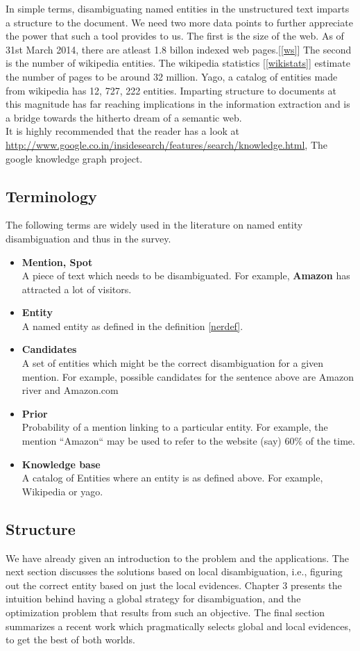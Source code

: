 In simple terms, disambiguating named entities in the unstructured text imparts a structure to the document. 
We need two more data points to further appreciate the power that such a tool provides to us.
The first is the size of the web. As of 31st March 2014, there are atleast 1.8 billon indexed web pages.[\ref{ws}]
The second is the number of wikipedia entities. The wikipedia statistics [\ref{wikistats}] estimate the number of pages to be
around 32 million. Yago, a catalog of entities made from wikipedia has 12, 727, 222 entities.	
Imparting structure to documents at this magnitude has far reaching implications in the information
extraction and is a bridge towards the hitherto dream of a semantic web.  \\


It is highly recommended that the reader has a look at \url{http://www.google.co.in/insidesearch/features/search/knowledge.html}, 
The google knowledge graph project.


\subsection{Terminology}
The following terms are widely used in the literature on named entity disambiguation and thus in the survey.

\begin{itemize}
 \item \textbf{Mention, Spot} \\
 A piece of text which needs to be disambiguated. For example, \textbf{Amazon} has attracted a lot of visitors.
 \item \textbf{Entity} \\
 A named entity as defined in the definition \ref{nerdef}. 
 \item \textbf{Candidates} \\
 A set of entities which might be the correct disambiguation for a given mention.
 For example, possible candidates for the sentence above are Amazon river and Amazon.com
 \item \textbf{Prior} \\
 Probability of a mention linking to a particular entity. For example, the mention ``Amazon`` may be used
 to refer to the website (say) 60\% of the time.
 \item \textbf{Knowledge base} \\
 A catalog of Entities where an entity is as defined above. For example, Wikipedia or yago.

\end{itemize}

\subsection{Structure}
We have already given an introduction to the problem and the applications. 
The next section discusses the solutions based on local disambiguation, i.e., figuring 
out the correct entity based on just the local evidences. Chapter 3 presents the intuition
behind having a global strategy for disambiguation, and the optimization problem that
results from such an objective. The final section summarizes a recent work which 
pragmatically selects global and local evidences, to get the best of both worlds.
